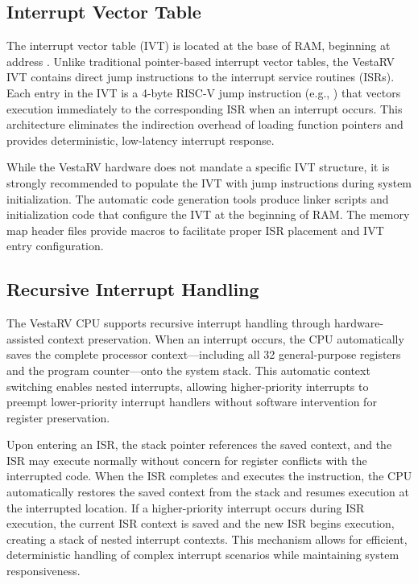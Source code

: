 \documentclass[11pt,pdftex,portrait,letterpaper]{article}
\begin{document}
\subsection{Interrupt Vector Table}

The interrupt vector table (IVT) is located at the base of RAM, beginning at address \texttt{\VectorsStartAddress}. Unlike traditional pointer-based interrupt vector tables, the VestaRV IVT contains direct jump instructions to the interrupt service routines (ISRs). Each entry in the IVT is a 4-byte RISC-V jump instruction (e.g., ) that vectors execution immediately to the corresponding ISR when an interrupt occurs. This architecture eliminates the indirection overhead of loading function pointers and provides deterministic, low-latency interrupt response.

While the VestaRV hardware does not mandate a specific IVT structure, it is strongly recommended to populate the IVT with jump instructions during system initialization. The automatic code generation tools produce linker scripts and initialization code that configure the IVT at the beginning of RAM. The memory map header files provide macros to facilitate proper ISR placement and IVT entry configuration.

\subsection{Recursive Interrupt Handling}

The VestaRV CPU supports recursive interrupt handling through hardware-assisted context preservation. When an interrupt occurs, the CPU automatically saves the complete processor context—including all 32 general-purpose registers and the program counter—onto the system stack. This automatic context switching enables nested interrupts, allowing higher-priority interrupts to preempt lower-priority interrupt handlers without software intervention for register preservation.

Upon entering an ISR, the stack pointer references the saved context, and the ISR may execute normally without concern for register conflicts with the interrupted code. When the ISR completes and executes the  instruction, the CPU automatically restores the saved context from the stack and resumes execution at the interrupted location. If a higher-priority interrupt occurs during ISR execution, the current ISR context is saved and the new ISR begins execution, creating a stack of nested interrupt contexts. This mechanism allows for efficient, deterministic handling of complex interrupt scenarios while maintaining system responsiveness.
\end{document}
